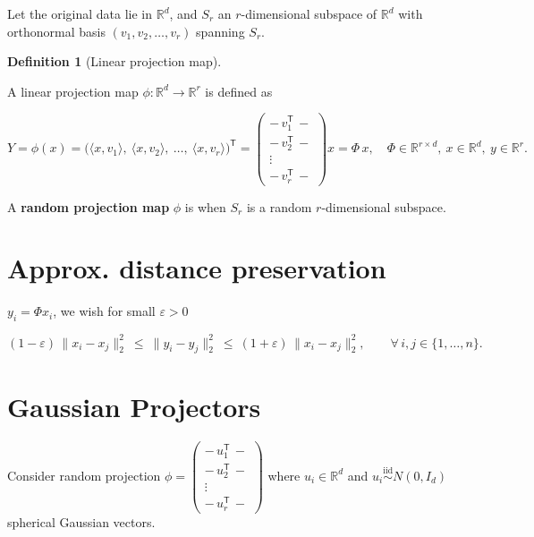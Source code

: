 \documentclass[
  letterpaper,
  DIV=11,
  numbers=noendperiod]{scrreprt}
\theoremstyle{definition}
\newtheorem{definition}{Definition}[chapter]
\theoremstyle{plain}
\theoremstyle{plain}
\theoremstyle{definition}
\theoremstyle{plain}
\theoremstyle{plain}
\theoremstyle{remark}
\begin{document}
Let the original data lie in \(\mathbb{R}^d\), and \(S_r\) an
\(r\)-dimensional subspace of \(\mathbb{R}^d\) with orthonormal basis
\((v_1, v_2, \dots, v_r)\) spanning \(S_r\).

\begin{definition}[Linear projection
map]\protect\hypertarget{def-projection}{}\label{def-projection}

A linear projection map \(\phi : \mathbb{R}^d \to \mathbb{R}^r\) is
defined as

\[
Y = \phi(x) = \big(\langle x, v_1\rangle,\ \langle x, v_2\rangle,\ \dots,\ \langle x, v_r\rangle\big)^{\mathsf{T}}
= \begin{pmatrix} -\,v_1^{\mathsf{T}}\,- \\ -\,v_2^{\mathsf{T}}\,- \\ \vdots \\ -\,v_r^{\mathsf{T}}\,- \end{pmatrix} x
= \Phi\, x,
\quad \Phi \in \mathbb{R}^{r \times d},\ x \in \mathbb{R}^d,\ y \in \mathbb{R}^r .
\]

\end{definition}

A \textbf{random projection map} \(\phi\) is when \(S_r\) is a random
\(r\)-dimensional subspace.

\section{Approx. distance
preservation}\label{approx.-distance-preservation}

\(y_i = \Phi x_i\), we wish for small \(\varepsilon > 0\)

\[
(1-\varepsilon)\,\|x_i - x_j\|_2^2 \ \le\ \|y_i - y_j\|_2^2 \ \le\ (1+\varepsilon)\,\|x_i - x_j\|_2^2,
\qquad \forall\, i, j \in \{1, \dots, n\}.
\]

\section{Gaussian Projectors}\label{gaussian-projectors}

Consider random projection
\(\phi = \begin{pmatrix} -\,u_1^{\mathsf{T}}\,- \\ -\,u_2^{\mathsf{T}}\,- \\ \vdots \\ -\,u_r^{\mathsf{T}}\,- \end{pmatrix}\)
where \(u_i \in \mathbb{R}^d\) and
\(u_i \overset{\text{iid}}{\sim} N(0, I_d)\) spherical Gaussian vectors.
\end{document}
